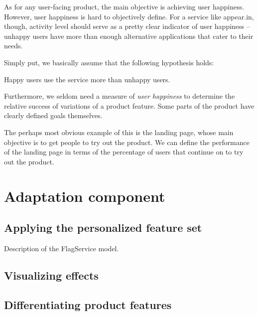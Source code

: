 As for any user-facing product, the main objective is achieving user happiness. However, user happiness is hard to objectively define. For a service like appear.in, though, activity level should serve as a pretty clear indicator of user happiness -- unhappy users have more than enough alternative applications that cater to their needs.

Simply put, we basically assume that the following hypothesis holds:

\begin{hypothesis}
  Happy users use the service more than unhappy users.
\end{hypothesis}

Furthermore, we seldom need a measure of \emph{user happiness} to determine the relative success of variations of a product feature. Some parts of the product have clearly defined goals themselves.

The perhaps most obvious example of this is the landing page, whose main objective is to get people to try out the product. We can define the performance of the landing page in terms of the percentage of users that continue on to try out the product.

\section{Adaptation component} %
\label{sec:adaptation_component}


\subsection{Applying the personalized feature set} %
\label{sub:applying_the_personalized_feature_set}

Description of the FlagService model.


\subsection{Visualizing effects} %
\label{sub:visualizing_effects}



\subsection{Differentiating product features} %
\label{sec:differentiating_product_features}

